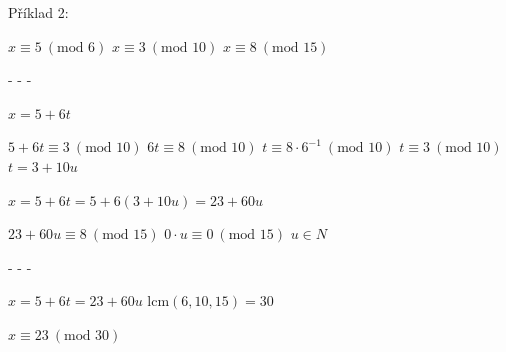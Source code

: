 \documentclass{szzclass}
\begin{document}
Příklad 2:
\begin{center}
$x \equiv 5~(\text{mod } 6)$\linebreak
$x \equiv 3~(\text{mod } 10)$\linebreak
$x \equiv 8~(\text{mod } 15)$

- - -

$x = 5 + 6t$

$5 + 6t \equiv 3~(\text{mod } 10)$\linebreak
$6t \equiv 8~(\text{mod }  10)$\linebreak
$t \equiv 8 \cdot 6^{-1}~(\text{mod }  10)$\linebreak
$t \equiv 3~(\text{mod }  10)$\linebreak
$t = 3 + 10u$

$x = 5 + 6t = 5 + 6(3 + 10u) = 23 + 60u$

$23 + 60u \equiv 8~(\text{mod } 15)$\linebreak
$0\cdot u \equiv 0~(\text{mod } 15)$\linebreak
$u \in N$

- - -

$x = 5 + 6t = 23 + 60u$\linebreak
lcm$(6, 10, 15) = 30$

$x \equiv 23~(\text{mod } 30)$


\end{center}
\end{document}
